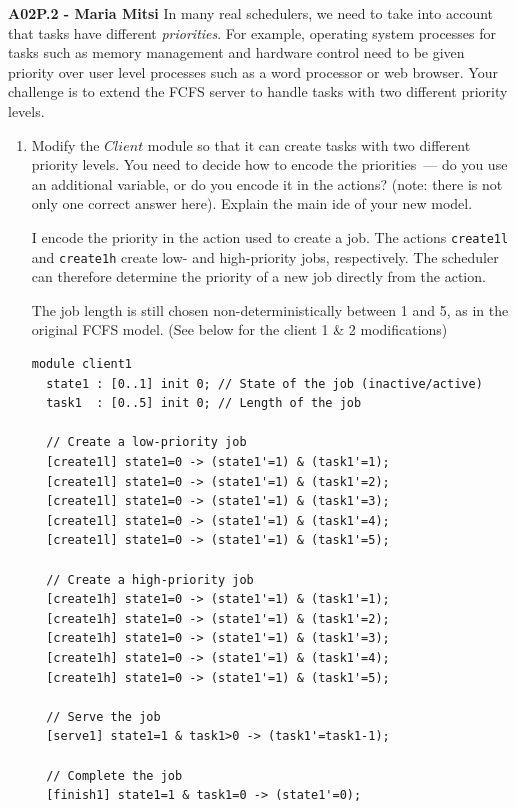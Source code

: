 \documentclass[12pt,a4paper]{article}
\newcommand{\prismident}[1]{\mathit{#1}}
\newcommand{\Pname}[1]{\prismident{#1}}
\begin{document}
\begin{description}
\clearpage

\item{\bf A02P.2 - Maria Mitsi} In many real schedulers, we need to take into account that tasks have different \emph{priorities}. For example, operating system
processes for tasks such as memory management and hardware control need to be given priority over user level processes such as a word
processor or web browser. Your challenge is to extend the FCFS server to handle tasks with two different priority levels.
\begin{enumerate}[label=\alph*)]
\item Modify the $\Pname{Client}$ module so that it can create tasks with two different priority levels. You need to decide how to
encode the priorities~--- do you use an additional variable, or do you encode it in the actions? (note: there is not only one correct answer here). Explain the main ide of your new model. 
%
\ifwithanswers
\color{blue}
\par
I encode the priority in the action used to create a job. The actions
\texttt{create1l} and \texttt{create1h} create low- and high-priority
jobs, respectively. The scheduler can therefore determine the priority
of a new job directly from the action.

The job length is still chosen non-deterministically between 1 and 5,
as in the original FCFS model. (See below for the client 1 \& 2 modifications)

\begin{lstlisting}
module client1
  state1 : [0..1] init 0; // State of the job (inactive/active)
  task1  : [0..5] init 0; // Length of the job
  
  // Create a low-priority job
  [create1l] state1=0 -> (state1'=1) & (task1'=1);
  [create1l] state1=0 -> (state1'=1) & (task1'=2);
  [create1l] state1=0 -> (state1'=1) & (task1'=3);
  [create1l] state1=0 -> (state1'=1) & (task1'=4);
  [create1l] state1=0 -> (state1'=1) & (task1'=5);

  // Create a high-priority job
  [create1h] state1=0 -> (state1'=1) & (task1'=1);
  [create1h] state1=0 -> (state1'=1) & (task1'=2);
  [create1h] state1=0 -> (state1'=1) & (task1'=3);
  [create1h] state1=0 -> (state1'=1) & (task1'=4);
  [create1h] state1=0 -> (state1'=1) & (task1'=5);

  // Serve the job
  [serve1] state1=1 & task1>0 -> (task1'=task1-1);

  // Complete the job
  [finish1] state1=1 & task1=0 -> (state1'=0);


\end{lstlisting}
\end{enumerate}
\end{description}
\end{document}
